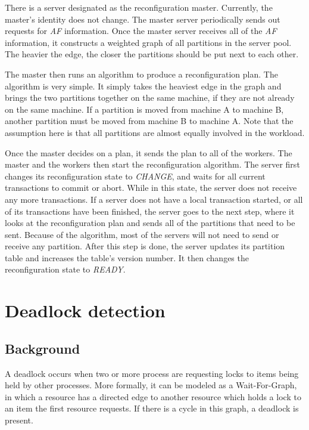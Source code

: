 \documentclass[a4paper, 10pt, notitlepage]{report}
\begin{document}
There is a server designated as the reconfiguration master. Currently, the master's identity does not change. The master server
periodically sends out requests for {\em AF} information. Once the master server receives all of the {\em AF} information, it
constructs a weighted graph of all partitions in the server pool. The heavier the edge, the closer the partitions should be 
put next to each other. 

The master then runs an algorithm to produce a reconfiguration plan. The algorithm is very simple. It simply takes the heaviest
edge in the graph and brings the two partitions together on the same machine, if they are not already on the same machine.
If a partition is moved from machine A to machine B, another partition must be moved from machine B to machine A. Note that the
assumption here is that all partitions are almost equally involved in the workload. 

Once the master decides on a plan, it sends the plan to all of the workers. The master and the workers then start the reconfiguration
algorithm. The server first changes its reconfiguration state to {\em CHANGE}, and waits for all current transactions to commit
or abort. While in this state, the server does not receive any more transactions.
If a server does not have a local transaction started, or all of its transactions have been finished, the server goes
to the next step, where it looks at the reconfiguration plan and sends all of the partitions that need to be sent. Because of the 
algorithm, most of the servers will not need to send or receive any partition. After this step is done, the server updates its
partition table and increases the table's version number. It then changes the reconfiguration state to {\em READY}.




\section*{Deadlock detection}
\subsection*{Background}
A deadlock occurs when two or more process are requesting locks to items being held by other processes. More formally, it can be modeled as a Wait-For-Graph, in which a resource has a directed edge to another resource which holds a lock to an item the first resource requests. If there is a cycle in this graph, a deadlock is present.
\end{document}
